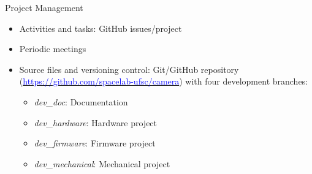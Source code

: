 %
%
%
%
%

%
%
%
%
%


\begin{frame}{Project Management}

    \begin{itemize}
        \item Activities and tasks: GitHub issues/project
        \vspace{0.25cm}
        \item Periodic meetings
        \vspace{0.25cm}
        \item Source files and versioning control: Git/GitHub repository (\href{https://github.com/spacelab-ufsc/camera}{\textcolor{blue}{https://github.com/spacelab-ufsc/camera}}) with four development branches:
            \begin{itemize}
                \item \textit{dev\_doc}: Documentation
                \item \textit{dev\_hardware}: Hardware project
                \item \textit{dev\_firmware}: Firmware project
                \item \textit{dev\_mechanical}: Mechanical project
            \end{itemize}
    \end{itemize}

\end{frame}


